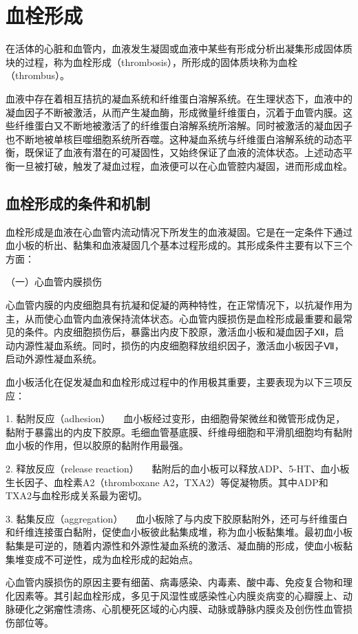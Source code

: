 \section{血栓形成}

在活体的心脏和血管内，血液发生凝固或血液中某些有形成分析出凝集形成固体质块的过程，称为血栓形成（thrombosis），所形成的固体质块称为血栓（thrombus）。

血液中存在着相互拮抗的凝血系统和纤维蛋白溶解系统。在生理状态下，血液中的凝血因子不断被激活，从而产生凝血酶，形成微量纤维蛋白，沉着于血管内膜。这些纤维蛋白又不断地被激活了的纤维蛋白溶解系统所溶解。同时被激活的凝血因子也不断地被单核巨噬细胞系统所吞噬。这种凝血系统与纤维蛋白溶解系统的动态平衡，既保证了血液有潜在的可凝固性，又始终保证了血液的流体状态。上述动态平衡一旦被打破，触发了凝血过程，血液便可以在心血管腔内凝固，进而形成血栓。

\subsection{血栓形成的条件和机制}

血栓形成是血液在心血管内流动情况下所发生的血液凝固。它是在一定条件下通过血小板的析出、黏集和血液凝固几个基本过程形成的。其形成条件主要有以下三个方面：

{（一）心血管内膜损伤}

心血管内膜的内皮细胞具有抗凝和促凝的两种特性，在正常情况下，以抗凝作用为主，从而使心血管内血液保持流体状态。心血管内膜损伤是血栓形成最重要和最常见的条件。内皮细胞损伤后，暴露出内皮下胶原，激活血小板和凝血因子Ⅻ，启动内源性凝血系统。同时，损伤的内皮细胞释放组织因子，激活血小板因子Ⅶ，启动外源性凝血系统。

血小板活化在促发凝血和血栓形成过程中的作用极其重要，主要表现为以下三项反应：

{1. 黏附反应（adhesion）}
　血小板经过变形，由细胞骨架微丝和微管形成伪足，黏附于暴露出的内皮下胶原。毛细血管基底膜、纤维母细胞和平滑肌细胞均有黏附血小板的作用，但以胶原的黏附作用最强。

{2. 释放反应（release reaction）}
　黏附后的血小板可以释放ADP、5-HT、血小板生长因子、血栓素A2（thromboxane
A2，TXA2）等促凝物质。其中ADP和TXA2与血栓形成关系最为密切。

{3. 黏集反应（aggregation）}
　血小板除了与内皮下胶原黏附外，还可与纤维蛋白和纤维连接蛋白黏附，促使血小板彼此黏集成堆，称为血小板黏集堆。最初血小板黏集是可逆的，随着内源性和外源性凝血系统的激活、凝血酶的形成，使血小板黏集堆变成不可逆性，成为血栓形成的起始点。

心血管内膜损伤的原因主要有细菌、病毒感染、内毒素、酸中毒、免疫复合物和理化因素等。其引起血栓形成，多见于风湿性或感染性心内膜炎病变的心瓣膜上、动脉硬化之粥瘤性溃疡、心肌梗死区域的心内膜、动脉或静脉内膜炎及创伤性血管损伤部位等。

